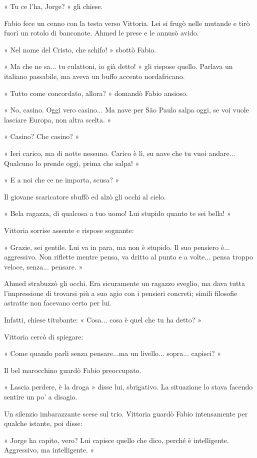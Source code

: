 « Tu ce l'ha, Jorge? » gli chiese.

Fabio fece un cenno con la testa verso Vittoria. Lei si frugò nelle mutande e tirò fuori un rotolo di banconote. Ahmed le prese e le annusò avido.

« Nel nome del Cristo, che schifo! » sbottò Fabio.

« Ma che ne sa... tu culattoni, io già detto! » gli rispose quello. Parlava un italiano passabile, ma aveva un buffo accento nordafricano.

« Tutto come concordato, allora? » domandò Fabio ansioso.

« No, casino. Oggi vero casino... Ma nave per São Paulo salpa oggi, se voi vuole lasciare Europa, non altra scelta. »

« Casino? Che casino? »

« Ieri carico, ma di notte nessuno. Carico è lì, su nave che tu vuoi andare... Qualcuno lo prende oggi, prima che salpa! »

« E a noi che ce ne importa, scusa? »

Il giovane scaricatore sbuffò ed alzò gli occhi al cielo.

« Bela ragazza, di qualcosa a tuo uomo! Lui stupido quanto te sei bella! »

Vittoria sorrise assente e rispose sognante:

« Grazie, sei gentile. Lui va in para, ma non è stupido. Il suo pensiero è... aggressivo. Non riflette mentre pensa, va dritto al punto e a volte... pensa troppo veloce, senza... pensare. »

Ahmed strabuzzò gli occhi. Era sicuramente un ragazzo sveglio, ma dava tutta l'impressione di trovarsi più a suo agio con i pensieri concreti; simili filosofie astratte non facevano certo per lui.

Infatti, chiese titubante: « Cosa... cosa è quel che tu ha detto? »

Vittoria cercò di spiegare:

« Come quando parli senza pensare...ma un livello... sopra... capisci? »

Il bel marocchino guardò Fabio preoccupato.

« Lascia perdere, è la droga » disse lui, sbrigativo. La situazione lo stava facendo sentire un po' a disagio.

Un silenzio imbarazzante scese sul trio. Vittoria guardò Fabio intensamente per qualche istante, poi disse:

« Jorge ha capito, vero? Lui capisce quello che dico, perché è intelligente. Aggressivo, ma intelligente. »

